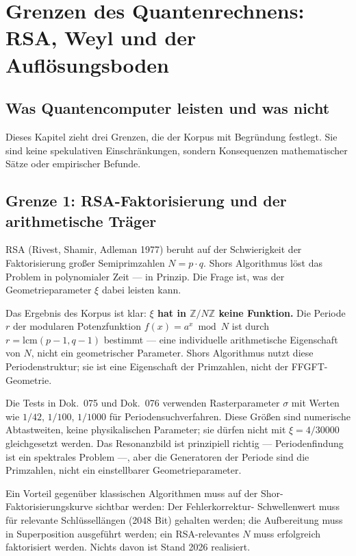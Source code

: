 \chapter{Grenzen des Quantenrechnens: RSA, Weyl und der Auflösungsboden}
\label{ch:grenze}

\section{Was Quantencomputer leisten und was nicht}

Dieses Kapitel zieht drei Grenzen, die der Korpus mit Begründung
festlegt. Sie sind keine spekulativen Einschränkungen, sondern
Konsequenzen mathematischer Sätze oder empirischer Befunde.

\section{Grenze 1: RSA-Faktorisierung und der arithmetische Träger}

RSA (Rivest, Shamir, Adleman 1977) beruht auf der Schwierigkeit der
Faktorisierung großer Semiprimzahlen $N = p\cdot q$. Shors Algorithmus
löst das Problem in polynomialer Zeit --- in Prinzip. Die Frage ist, was
der Geometrieparameter $\xi$ dabei leisten kann.

Das Ergebnis des Korpus ist klar: \textbf{$\xi$ hat in $\mathbb{Z}/N\mathbb{Z}$
keine Funktion.} Die Periode $r$ der modularen Potenzfunktion
$f(x) = a^x\bmod N$ ist durch $r = \mathrm{lcm}(p-1,q-1)$ bestimmt ---
eine individuelle arithmetische Eigenschaft von $N$, nicht ein
geometrischer Parameter. Shors Algorithmus nutzt diese Periodenstruktur;
sie ist eine Eigenschaft der Primzahlen, nicht der FFGFT-Geometrie.

Die Tests in Dok.~075 und Dok.~076 verwenden Rasterparameter $\sigma$
mit Werten wie $1/42$, $1/100$, $1/1000$ für Periodensuchverfahren.
Diese Größen sind numerische Abtastweiten, keine physikalischen
Parameter; sie dürfen nicht mit $\xi = 4/30000$ gleichgesetzt werden.
Das Resonanzbild ist prinzipiell richtig --- Periodenfindung ist ein
spektrales Problem ---, aber die Generatoren der Periode sind die
Primzahlen, nicht ein einstellbarer Geometrieparameter.

Ein Vorteil gegenüber klassischen Algorithmen muss auf der
Shor-Faktorisierungskurve sichtbar werden: Der Fehlerkorrektur-
Schwellenwert muss für relevante Schlüssellängen (2048 Bit) gehalten
werden; die Aufbereitung muss in Superposition ausgeführt werden; ein
RSA-relevantes $N$ muss erfolgreich faktorisiert werden. Nichts davon
ist Stand 2026 realisiert.

